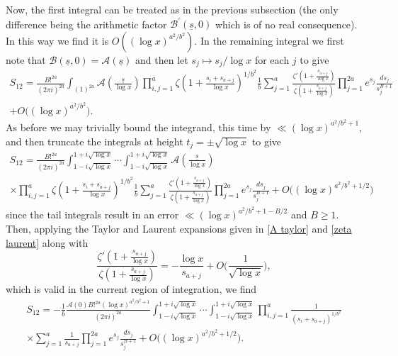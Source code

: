 \documentclass[oneside, 12pt]{amsart}
\theoremstyle{definition}
\newcommand{\mc}{\mathcal}
\newcommand{\ul}{\underline}
\newcommand{\geqs}{\geqslant }
\begin{document}
Now, the first integral can be treated as in the previous subsection (the only difference being the arithmetic factor $\mc{B}^\prime(\ul{s},0)$ which is of no real consequence). In this way we find it is $O((\log x)^{a^2/b^2})$. In the remaining integral we first note that $\mc{B}(\ul s,0)=\mc{A}(\ul s)$ and then let $s_j\mapsto s_j/\log x$ for each $j$ to give  
\begin{multline*}
S_{12} =  
 \frac{B!^{2a}}{(2\pi i)^{2a}}\int_{(1)^{2a}}\mc{A}(\frac{\ul s}{\log x})\prod_{i,j=1}^a \zeta(1+\frac{s_i+s_{a+j}}{\log x} )^{1/b^2}\frac{1}{b} \sum_{j=1}^a \frac{ \zeta'(1+\frac{s_{a+j}}{\log x}) }{ \zeta(1+\frac{s_{a+j}}{\log x}) }   \prod_{j=1}^{2a}e^{s_j}\frac{ds_j}{s_j^{B+1}}
 \\
+ O\big((\log x)^{a^2/b^2}\big).
\end{multline*}
As before we may trivially bound the integrand, this time by $\ll (\log x)^{a^2/b^2+1}$, and then truncate the integrals at height $t_j=\pm\sqrt{\log x}$ to give
\begin{multline*}
S_{12} =  
 \frac{B!^{2a}}{(2\pi i)^{2a}}\int_{1-i\sqrt{\log x}}^{1+i\sqrt{\log x}}\!\!\!\cdots \int_{1-i\sqrt{\log x}}^{1+i\sqrt{\log x}}
 \mc{A}(\frac{\ul s}{\log x})
 \\
 \times
 \prod_{i,j=1}^a \zeta(1+\frac{s_i+s_{a+j}}{\log x} )^{1/b^2}\frac{1}{b} \sum_{j=1}^a \frac{ \zeta'(1+\frac{s_{a+j}}{\log x}) }{ \zeta(1+\frac{s_{a+j}}{\log x}) }   
 \prod_{j=1}^{2a}e^{s_j}\frac{ds_j}{s_j^{B+1}}
+ O\big((\log x)^{a^2/b^2+1/2}\big)
\end{multline*}  
since the tail integrals result in an error $\ll (\log x)^{a^2/b^2+1-B/2}$ and $B\geqs 1$. Then, applying the Taylor and Laurent expansions given  in \eqref{A taylor} and \eqref{zeta laurent} along with 
\begin{equation}
\label{log der laurent}
 \frac{ \zeta'(1+\frac{s_{a+j}}{\log x}) }{ \zeta(1+\frac{s_{a+j}}{\log x}) } 
 =
 -\frac{\log x}{s_{a+j}}+O\Big(\frac{1}{\sqrt{\log x}}\Big),
\end{equation}
which is valid in the current region of integration, we find 
\begin{multline*}
S_{12} = -\frac{1}{b} \frac{\mc{A}(\ul{0})B!^{2a}(\log x)^{a^2/b^2+1}}{(2\pi i)^{2a}}  \int_{1-i\sqrt{\log x}}^{1+i\sqrt{\log x}}\!\!\! \cdots \int_{1-i\sqrt{\log x}}^{1+i\sqrt{\log x}} \prod_{i,j=1}^a\frac{1}{(s_i+s_{a+j})^{1/b^2}} \\
 \times \sum_{j=1}^a \frac{1}{s_{a+j}}\prod_{j=1}^{2a}e^{s_j}\frac{ds_j}{s_j^{B+1}}
+ O\big((\log x)^{a^2/b^2+1/2}\big).
 \end{multline*}
\end{document}

